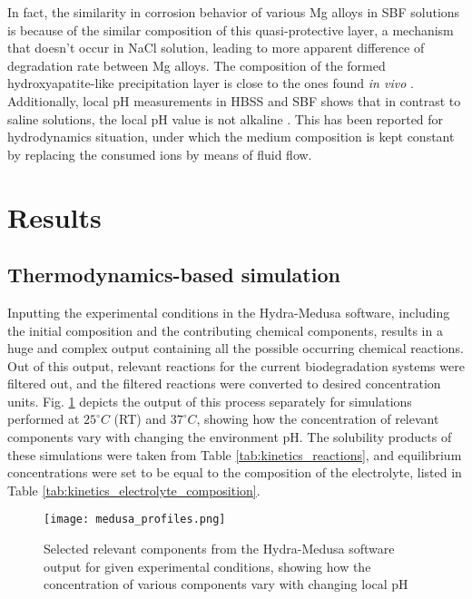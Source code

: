 In fact, the similarity in corrosion behavior of various Mg alloys in SBF solutions is because of the similar composition of this quasi-protective layer, a mechanism that doesn't occur in NaCl solution, leading to more apparent difference of degradation rate between Mg alloys. The composition of the formed hydroxyapatite-like precipitation layer is close to the ones found \textit{in vivo} \cite{Mei2020}. Additionally, local pH measurements in HBSS and SBF shows that in contrast to saline solutions, the local pH value is not alkaline \cite{Lamaka2018,Mei2021}. This has been reported for hydrodynamics situation, under which the medium composition is kept constant by replacing the consumed ions by means of fluid flow.


\section{Results}

\subsection{Thermodynamics-based simulation}

Inputting the experimental conditions in the Hydra-Medusa software, including the initial composition and the contributing chemical components, results in a huge and complex output containing all the possible occurring chemical reactions. Out of this output, relevant reactions for the current biodegradation systems were filtered out, and the filtered reactions were converted to desired concentration units. Fig. \ref{fig:kinetics_medusa_profiles} depicts the output of this process separately for simulations performed at $25^{\circ}C$ (RT) and $37^{\circ}C$, showing how the concentration of relevant components vary with changing the environment pH. The solubility products of these simulations were taken from Table \ref{tab:kinetics_reactions}, and equilibrium concentrations were set to be equal to the composition of the electrolyte, listed in Table  \ref{tab:kinetics_electrolyte_composition}.

\begin{figure}[h]
\centering
\medskip
\texttt{[image: medusa\_profiles.png]}
\caption[Hydra-Medusa software output for given experimental conditions]{Selected relevant components from the Hydra-Medusa software output for given experimental conditions, showing how the concentration of various components vary with changing local pH} \label{fig:kinetics_medusa_profiles}
\end{figure}

